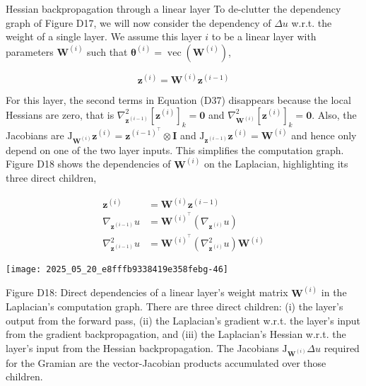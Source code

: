 \documentclass[10pt]{article}
\begin{document}
Hessian backpropagation through a linear layer To de-clutter the dependency graph of Figure D17, we will now consider the dependency of $\Delta u$ w.r.t. the weight of a single layer. We assume this layer $i$ to be a linear layer with parameters $\boldsymbol{W}^{(i)}$ such that $\boldsymbol{\theta}^{(i)}=\operatorname{vec}\left(\boldsymbol{W}^{(i)}\right)$,


\begin{equation*}
\boldsymbol{z}^{(i)}=\boldsymbol{W}^{(i)} \boldsymbol{z}^{(i-1)} \tag{D39}
\end{equation*}


For this layer, the second terms in Equation (D37) disappears because the local Hessians are zero, that is $\nabla_{\boldsymbol{z}^{(i-1)}}^{2}\left[\boldsymbol{z}^{(i)}\right]_{k}=\mathbf{0}$ and $\nabla_{\boldsymbol{W}^{(i)}}^{2}\left[\boldsymbol{z}^{(i)}\right]_{k}=\mathbf{0}$. Also, the Jacobians are $\mathrm{J}_{\boldsymbol{W}^{(i)}} \boldsymbol{z}^{(i)}=\boldsymbol{z}^{(i-1)^{\top}} \otimes \boldsymbol{I}$ and $\mathrm{J}_{\boldsymbol{z}^{(i-1)}} \boldsymbol{z}^{(i)}=\boldsymbol{W}^{(i)}$ and hence only depend on one of the two layer inputs. This simplifies the computation graph. Figure D18 shows the dependencies of $\boldsymbol{W}^{(i)}$ on the Laplacian, highlighting its three direct children,


\begin{align*}
\boldsymbol{z}^{(i)} & =\boldsymbol{W}^{(i)} \boldsymbol{z}^{(i-1)} \\
\nabla_{\boldsymbol{z}^{(i-1)}} u & =\boldsymbol{W}^{(i)^{\top}}\left(\nabla_{\boldsymbol{z}^{(i)}} u\right)  \tag{D40}\\
\nabla_{\boldsymbol{z}^{(i-1)}}^{2} u & =\boldsymbol{W}^{(i)^{\top}}\left(\nabla_{\boldsymbol{z}^{(i)}}^{2} u\right) \boldsymbol{W}^{(i)}
\end{align*}


\begin{center}
\texttt{[image: 2025\_05\_20\_e8fffb9338419e358febg-46]}
\end{center}

Figure D18: Direct dependencies of a linear layer's weight matrix $\boldsymbol{W}^{(i)}$ in the Laplacian's computation graph. There are three direct children: (i) the layer's output from the forward pass, (ii) the Laplacian's gradient w.r.t. the layer's input from the gradient backpropagation, and (iii) the Laplacian's Hessian w.r.t. the layer's input from the Hessian backpropagation. The Jacobians $\mathrm{J}_{\boldsymbol{W}^{(i)}} \Delta u$ required for the Gramian are the vector-Jacobian products accumulated over those children.
\end{document}
